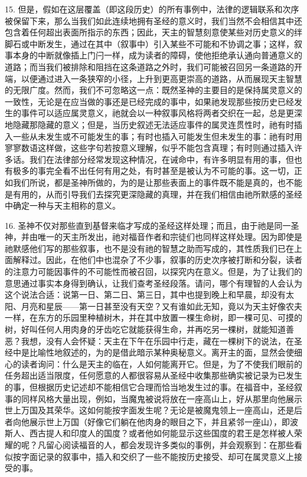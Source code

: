 15. 但是，假如在这层覆盖（即这段历史）的所有事例中，法律的逻辑联系和次序被保留下来，那么当我们如此连续地拥有圣经的意义时，我们当然不会相信其中还包含着任何超出表面所指示的东西；因此，天主的智慧刻意使某些对历史意义的绊脚石或中断发生，通过在其中（叙事中）引入某些不可能和不协调之事；这样，叙事本身的中断就像插上门闩一样，成为读者的障碍，使他拒绝承认通向普通意义的道路；而当我们被排除和阻挡在这条道路之外时，我们可能被召回另一条道路的开端，以便通过进入一条狭窄的小径，上升到更高更崇高的道路，从而展现天主智慧的无限广度。然而，我们不可忽略这一点：既然圣神的主要目的是保持属灵意义的一致性，无论是在应当做的事还是已经完成的事中，如果祂发现那些按历史已经发生的事件可以适应属灵意义，祂就会以一种叙事风格将两者交织在一起，总是更深地隐藏那隐藏的意义；但是，当历史叙述无法适应事件的属灵连贯性时，祂有时插入一些从未发生或不可能发生的事；有时也插入可能发生但未发生的事：祂有时用寥寥数语这样做，这些字句若按意义理解，似乎不能包含真理；有时则通过插入许多话。我们在法律部分经常发现这种情况，在诫命中，有许多明显有用的事，但也有极多的事完全看不出任何有用之处，有时甚至是被认为不可能的事。这一切，正如我们所说，都是圣神所做的，为的是让那些表面上的事件既不能是真的，也不能是有用的，从而引导我们去探究更深隐藏的真理，并在我们相信由祂所默感的圣经中确定一种与天主相称的意义。\par

16. 圣神不仅对那些直到基督来临才写成的圣经这样处理；而且，由于祂是同一圣神，并由唯一的天主所发出，祂对福音作者和宗徒们也同样这样处理。因为即使是祂默感他们写的那些叙事，也不是没有祂的智慧之助而写成的，其性质我们已在上面解释过。因此，在他们中也混杂了不少事，叙事的历史次序被打断和分裂，读者的注意力可能因事件的不可能性而被召回，以探究内在意义。但是，为了让我们的意思通过事实本身得到确认，让我们查考圣经段落。请问，哪个有理智的人会认为这个说法合适：说第一日、第二日、第三日，其中也提到晚上和早晨，却没有太阳、月亮和星辰——第一日甚至没有天空？又有谁如此无知，竟以为天主好像农夫一样，在东方的乐园里种植树木，并在其中放置一棵生命树，即一棵可见、可摸的树，好叫任何人用肉身的牙齿吃它就能获得生命，并再吃另一棵树，就能知道善恶？我想，没有人会怀疑：天主在下午在乐园中行走，藏在一棵树下的说法，在圣经中是比喻性地叙述的，为的是借此暗示某种奥秘意义。离开主的面，显然会使细心的读者询问：什么是天主的临在，人如何能离开它。但是，为了不使我们眼前的任务超出适当限度，任何愿意的人都很容易从圣经中收集那些确实被记录为已发生的事，但根据历史记述却不能相信它合理而恰当地发生过的事。在福音中，圣经叙事的同样风格大量出现，例如，当魔鬼被说将放在一座高山上，好从那里向他展示世上万国及其荣华。这如何能按字面发生呢？无论是被魔鬼领上一座高山，还是后者向他展示世上万国（好像它们躺在他肉身的眼目之下，并且紧邻一座山），即波斯人、西古提人和印度人的国度？或者他如何能显示这些国度的君王是怎样被人荣耀的呢？凡留心阅读福音的人，都会发现许多类似的事例，并会观察到：在那些看似按字面记录的叙事中，插入和交织了一些不能按历史接受、却可在属灵意义上接受的事。\par

